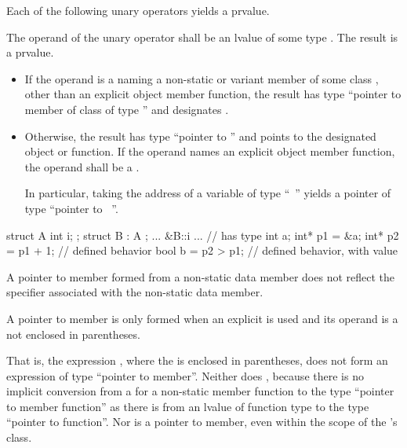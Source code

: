 \pnum
Each of the following unary operators yields a prvalue.

\pnum
{}%
%
The operand of the unary \tcode{\&} operator
shall be an lvalue of some type .
The result is a prvalue.
\begin{itemize}
\item
If the operand is a  naming a non-static or variant member 
of some class , other than an explicit object member function, the result has type ``pointer to member
of class  of type '' and designates .
\item
Otherwise, the result has type ``pointer to '' and points to
the designated object or function.
If the operand names an explicit object member function,
the operand shall be a .
\begin{note}
In particular, taking the address of a variable of type ``\cv{}~''
yields a pointer of type ``pointer to \cv{}~''.
\end{note}
\end{itemize}
\begin{example}
\begin{codeblock}
struct A { int i; };
struct B : A { };
... &B::i ...       // has type 
int a;
int* p1 = &a;
int* p2 = p1 + 1;   // defined behavior
bool b = p2 > p1;   // defined behavior, with value 
\end{codeblock}
\end{example}
\begin{note}
A pointer to member formed from a  non-static data
member does not reflect the  specifier
associated with the non-static data member.
\end{note}

\pnum
A pointer to member is only formed when an explicit \tcode{\&} is used
and its operand is a  not enclosed in
parentheses.
\begin{note}
That is, the expression , where the
 is enclosed in parentheses, does not form an
expression of type ``pointer to member''. Neither does
, because there is no implicit conversion from a
 for a non-static member function to the type
``pointer to member function'' as there is from an lvalue of function
type to the type ``pointer to function''. Nor is
 a pointer to member, even within the scope of
the 's class.
\end{note}

